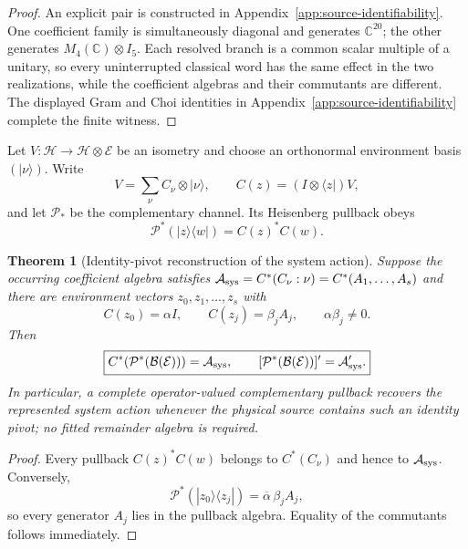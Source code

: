 \documentclass[11pt]{article}
\newtheorem{theorem}{Theorem}[section]
\theoremstyle{definition}
\theoremstyle{remark}
\newcommand{\C}{\mathbb C}
\newcommand{\Hh}{\mathcal H}
\begin{document}
\begin{proof}
An explicit pair is constructed in Appendix~\ref{app:source-identifiability}.
One coefficient family is simultaneously diagonal and generates
$\C^{20}$; the other generates $M_4(\C)\otimes I_5$.  Each resolved branch is
a common scalar multiple of a unitary, so every uninterrupted classical word
has the same effect in the two realizations, while the coefficient algebras
and their commutants are different.  The displayed Gram and Choi identities in
Appendix~\ref{app:source-identifiability} complete the finite witness.
\end{proof}

Let $V:\Hh\to\Hh\otimes\mathcal E$ be an isometry and choose an orthonormal
environment basis $(|\nu\rangle)$.  Write
\[
 V=\sum_\nu C_\nu\otimes|\nu\rangle,
 \qquad
 C(z)=(I\otimes\langle z|)V,
\]
and let $\mathcal P_*$ be the complementary channel.  Its Heisenberg pullback
obeys
\begin{equation}
 \mathcal P^*(|z\rangle\langle w|)=C(z)^*C(w).
 \label{eq:complementary-pullback}
\end{equation}

\begin{theorem}[Identity-pivot reconstruction of the system action]
\label{thm:pullback-reconstruction}
Suppose the occurring coefficient algebra satisfies
$\mathcal A_{\rm sys}=C^*(C_\nu:\nu)=C^*(A_1,\ldots,A_s)$ and there are environment vectors
$z_0,z_1,\ldots,z_s$ with
\[
 C(z_0)=\alpha I,\qquad C(z_j)=\beta_jA_j,
 \qquad \alpha\beta_j\ne0.
\]
Then
\begin{equation}
 \boxed{
 C^*\!\left(\mathcal P^*(\mathcal B(\mathcal E))\right)
 =\mathcal A_{\rm sys},
 \qquad
 [\mathcal P^*(\mathcal B(\mathcal E))]'=\mathcal A_{\rm sys}'.}
 \label{eq:pullback-reconstruction}
\end{equation}
In particular, a complete operator-valued complementary pullback recovers the
represented system action whenever the physical source contains such an
identity pivot; no fitted remainder algebra is required.
\end{theorem}

\begin{proof}
Every pullback $C(z)^*C(w)$ belongs to $C^*(C_\nu)$ and hence to
$\mathcal A_{\rm sys}$.  Conversely,
\[
 \mathcal P^*(|z_0\rangle\langle z_j|)
 =\overline\alpha\,\beta_j A_j,
\]
so every generator $A_j$ lies in the pullback algebra.  Equality of the
commutants follows immediately.
\end{proof}
\end{document}
